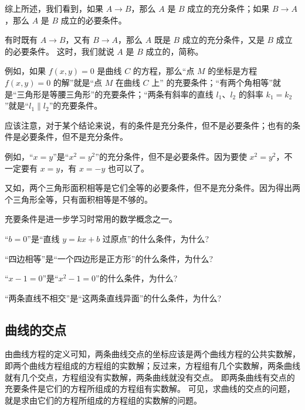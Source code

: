 综上所述，我们看到，如果 $A \to B$，那么 $A$ 是 $B$ 成立的充分条件；如果 $B \to A$，那么 $A$ 是 $B$ 成立的必要条件。

有时既有 $A \to B$，又有 $B \to A$，那么 $A$ 既是 $B$ 成立的充分条件，又是 $B$ 成立的必要条件。
这时，我们就说 $A$ 是 $B$ 成立的，简称。

例如，如果 $f(x,y)=0$ 是曲线 $C$ 的方程，那么“点 $M$ 的坐标是方程 $f(x,y)=0$ 的解”就是“点 $M$ 在曲线 $C$ 上” 的充要条件；“有两个角相等”就是“三角形是等腰三角形”的充要条件；“两条有斜率的直线 $l_1$、$l_2$ 的斜率 $k_1=k_2$”就是“$l_1\parallel l_2$”的充要条件。

应该注意，对于某个结论来说，有的条件是充分条件，但不是必要条件；也有的条件是必要条件，但不是充分条件。

例如，“$x=y$”是“$x^2=y^2$”的充分条件，但不是必要条件。因为要使 $x^2=y^2$，不一定要有 $x=y$，有 $x=-y$ 也可以了。

又如，两个三角形面积相等是它们全等的必要条件，但不是充分条件。因为得出两个三角形全等，只有面积相等是不够的。

充要条件是进一步学习时常用的数学概念之一。
\begin{Practice}
  \begin{question}
    \item “$b=0$”是“直线 $y=kx+b$ 过原点”的什么条件，为什么?
    \item “四边相等”是“一个四边形是正方形”的什么条件，为什么?
    \item “$x-1=0$”是“$x^2-1=0$”的什么条件，为什么?
    \item “两条直线不相交”是“这两条直线异面”的什么条件，为什么?
  \end{question}
\end{Practice}

\subsection{曲线的交点}
由曲线方程的定义可知，两条曲线交点的坐标应该是两个曲线方程的公共实数解，即两个曲线方程组成的方程组的实数解；反过来，方程组有几个实数解，两条曲线就有几个交点，方程组没有实数解，两条曲线就没有交点。
即两条曲线有交点的充要条件是它们的方程所组成的方程组有实数解。
可见，求曲线的交点的问题，就是求由它们的方程所组成的方程组的实数解的问题。

